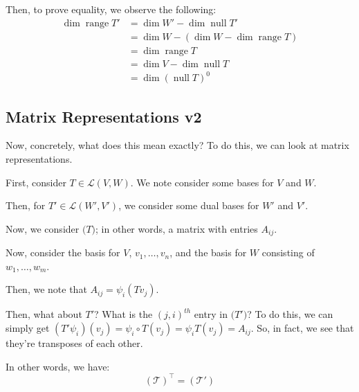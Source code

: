 \documentclass[openany]{book}
\DeclareMathOperator*{\vnull}{null}
\DeclareMathOperator*{\vrange}{range}
\begin{document}
Then, to prove equality, we observe the following:
\begin{align*}
	\dim \vrange T' &= \dim W' - \dim \vnull T' \\
	&= \dim W - (\dim W - \dim \vrange T) \\
	&= \dim \vrange T \\
	&= \dim V - \dim \vnull T \\
	&= \dim (\vnull T)^{0}
\end{align*}

\begin{comment}
	\vrange T' = functionals such that \varphi \circ T.
(\vnull T)^{0} = \varphi in V' such that \varphi(v) = 0 for all v in vnull T.

If v \in vnull T -> Tv = 0 -> (\varphi T)(0) = 0 -> \vrange T' \subseteq (\vnull T)^{0}.

Similarly, we observe that for any \dim \vrange T' = \dim W' - \dim W \vnull T' = \dim W - \dim \vrange T^{0} = \dim W - (\dim W - \dim \vrange T) = \dim \vrange T = \dim V - \dim \vnull T = (\dim \vnull T)^{0}.
\end{comment}

\subsection{Matrix Representations v2}
Now, concretely, what does this mean exactly? To do this, we can look at matrix representations.

First, consider $T \in \mathcal L(V,W)$. We note consider some bases for $V$ and $W$.

Then, for $T' \in \mathcal L(W', V')$, we consider some dual bases for $W'$ and $V'$.

Now, we consider $\mathcal (T)$; in other words, a matrix with entries $A_{ij}$.

Now, consider the basis for $V$, $v_{1}, \ldots, v_{n}$, and the basis for $W$ consisting of $w_{1}, \ldots, w_{m}$.

Then, we note that $A_{ij} = \psi_{i}(Tv_{j})$.

Then, what about $T'$? What is the $(j,i)^{th}$ entry in $\mathcal (T')$?
To do this, we can simply get $(T'\psi_{i})(v_{j}) = \psi_i \circ T(v_{j}) = \psi_i T(v_{j}) = A_{ij}$. So, in fact, we see that they're transposes of each other.

In other words, we have:
\begin{equation*}
	(\mathcal T)^{\intercal} = (\mathcal T')
\end{equation*}
\end{document}
